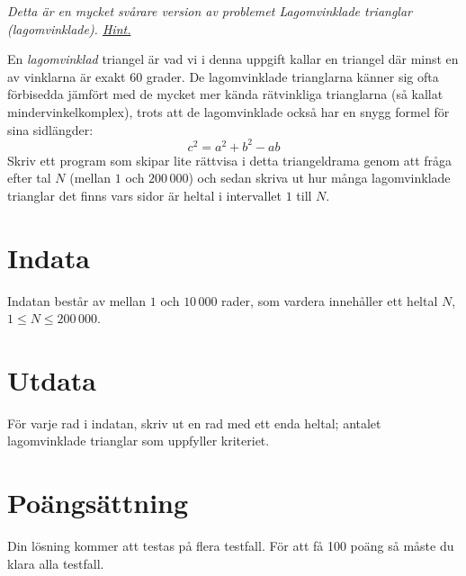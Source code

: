 \emph{Detta är en mycket svårare version av problemet Lagomvinklade trianglar (lagomvinklade). \href{https://en.wikipedia.org/wiki/Eisenstein_integer}{Hint.}}

En \emph{lagomvinklad} triangel är vad vi i denna uppgift kallar en triangel där minst en av vinklarna är exakt 60 grader. De lagomvinklade trianglarna känner sig ofta förbisedda jämfört med de mycket mer kända rätvinkliga trianglarna (så kallat mindervinkelkomplex), trots att de lagomvinklade också har en snygg formel för sina sidlängder:
\begin{equation*}
	c^2 = a^2 + b^2 - ab
\end{equation*}
Skriv ett program som skipar lite rättvisa i detta triangeldrama genom att fråga efter tal $N$ (mellan $1$ och $200\,000$) och sedan skriva ut hur många lagomvinklade trianglar det finns vars sidor är heltal i intervallet $1$ till $N$.

\section*{Indata}
Indatan består av mellan $1$ och $10\,000$ rader, som vardera innehåller ett heltal $N$, $1 \leq N \leq 200\,000$.

\section*{Utdata}
För varje rad i indatan, skriv ut en rad med ett enda heltal; antalet lagomvinklade trianglar som uppfyller kriteriet.

\section*{Poängsättning}
Din lösning kommer att testas på flera testfall. För att få 100 poäng så måste du klara alla testfall.

